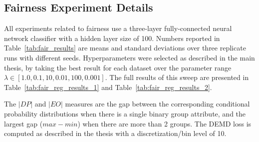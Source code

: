 \subsection{Fairness Experiment Details}
All experiments related to fairness use a three-layer fully-connected neural network classifier with a hidden layer size of 100. Numbers reported in Table~\ref{tab:fair_results} are means and standard deviations over three replicate runs with different seeds.
Hyperparameters were selected as described in the main thesis,
by taking the best result for each dataset over the parameter range $\lambda \in [1.0, 0.1, 10, 0.01, 100, 0.001]$. The full results of this sweep are presented in Table~\ref{tab:fair_reg_results_1} and Table~\ref{tab:fair_reg_results_2}.

The $|DP|$ and $|EO|$ measures are the gap between the corresponding conditional probability distributions when there is a single binary group attribute, and the largest gap ($max - min$) when there are more than 2 groups. The DEMD loss is computed as described in the thesis with a discretization/bin level of 10.



